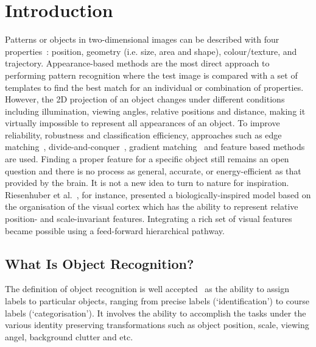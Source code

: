 \chapter{Introduction}
\label{cha:intro}
Patterns or objects in two-dimensional images can be described with four properties~\cite{wysoski2008fast}: position, geometry (i.e. size, area and shape), colour/texture, and trajectory. 
Appearance-based methods are the most direct approach to performing pattern recognition where the test image is compared with a set of templates to find the best match for an individual or combination of properties. 
However, the 2D projection of an object changes under different conditions including illumination, viewing angles, relative positions and distance, making it virtually impossible to represent all appearances of an object. 
To improve reliability, robustness and classification efficiency, approaches such as edge matching~\cite{canny1986computational}, divide-and-conquer~\cite{toygar2004multiple}, gradient matching~\cite{wei2006robust} and feature based methods~\cite{lowe2004distinctive, bay2008speeded} are used.
Finding a proper feature for a specific object still remains an open question and there is no process as general, accurate, or energy-efficient as that provided by the brain.
It is not a new idea to turn to nature for inspiration. 
Riesenhuber et al.~\cite{riesenhuber1999hierarchical}, for instance, presented a biologically-inspired model based on the organisation of the visual cortex which has the ability to represent relative position- and scale-invariant features.
Integrating a rich set of visual features became possible using a feed-forward hierarchical pathway. 

\section{What Is Object Recognition?}
\label{sec:aim}
The definition of object recognition is well accepted~\cite{dicarlo2012does} as the ability to assign labels to particular objects, ranging from precise labels (`identification') to course labels (`categorisation').
It involves the ability to accomplish the tasks under the various identity preserving transformations such as object position, scale, viewing angel, background clutter and etc.

